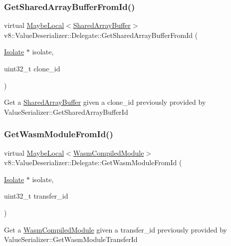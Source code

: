 \subsubsection{\texorpdfstring{Get\+Shared\+Array\+Buffer\+From\+Id()}{GetSharedArrayBufferFromId()}}
{\footnotesize\ttfamily virtual \mbox{\hyperlink{classv8_1_1MaybeLocal}{Maybe\+Local}}$<$\mbox{\hyperlink{classv8_1_1SharedArrayBuffer}{Shared\+Array\+Buffer}}$>$ v8\+::\+Value\+Deserializer\+::\+Delegate\+::\+Get\+Shared\+Array\+Buffer\+From\+Id (\begin{DoxyParamCaption}\item[{\mbox{\hyperlink{classv8_1_1Isolate}{Isolate}} $\ast$}]{isolate,  }\item[{uint32\+\_\+t}]{clone\+\_\+id }\end{DoxyParamCaption})\hspace{0.3cm}{\ttfamily [virtual]}}

Get a \mbox{\hyperlink{classv8_1_1SharedArrayBuffer}{Shared\+Array\+Buffer}} given a clone\+\_\+id previously provided by Value\+Serializer\+::\+Get\+Shared\+Array\+Buffer\+Id \mbox{\label{classv8_1_1ValueDeserializer_1_1Delegate_adcaa80ce590bbcfaac4929a9e7b49249}} 
\subsubsection{\texorpdfstring{Get\+Wasm\+Module\+From\+Id()}{GetWasmModuleFromId()}}
{\footnotesize\ttfamily virtual \mbox{\hyperlink{classv8_1_1MaybeLocal}{Maybe\+Local}}$<$\mbox{\hyperlink{classv8_1_1WasmCompiledModule}{Wasm\+Compiled\+Module}}$>$ v8\+::\+Value\+Deserializer\+::\+Delegate\+::\+Get\+Wasm\+Module\+From\+Id (\begin{DoxyParamCaption}\item[{\mbox{\hyperlink{classv8_1_1Isolate}{Isolate}} $\ast$}]{isolate,  }\item[{uint32\+\_\+t}]{transfer\+\_\+id }\end{DoxyParamCaption})\hspace{0.3cm}{\ttfamily [virtual]}}

Get a \mbox{\hyperlink{classv8_1_1WasmCompiledModule}{Wasm\+Compiled\+Module}} given a transfer\+\_\+id previously provided by Value\+Serializer\+::\+Get\+Wasm\+Module\+Transfer\+Id \mbox{\label{classv8_1_1ValueDeserializer_1_1Delegate_a8b06c19cba7e80c3c5271b0a2ca88a8a}} 
